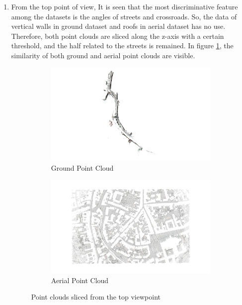 \documentclass[11pt]{article}
\begin{document}
\begin{enumerate}
        \item From the top point of view, It is seen that the most discriminative feature among the datasets
        is the angles of streets and crossroads. So, the data of vertical walls in ground dataset and roofs
        in aerial dataset has no use. Therefore, both point clouds are sliced along the z-axis with a certain
        threshold, and the half related to the streets is remained. In figure \ref{fig:ply_sliced}, the similarity of
        both ground and aerial point clouds are visible.
        \begin{figure}
            \centering
            \begin{subfigure}{0.45\textwidth}
                \centering
                \includegraphics[width=\linewidth]{images/experiment/ply_sliced_ground}
                \caption{Ground Point Cloud}
            \end{subfigure}
            \hfill
            \begin{subfigure}{0.45\textwidth}
                \centering
                \includegraphics[width=\linewidth]{images/experiment/ply_sliced_aerial}
                \caption{Aerial Point Cloud}
            \end{subfigure}
            \caption{Point clouds sliced from the top viewpoint}
            \label{fig:ply_sliced}
        \end{figure}


\end{enumerate}
\end{document}
